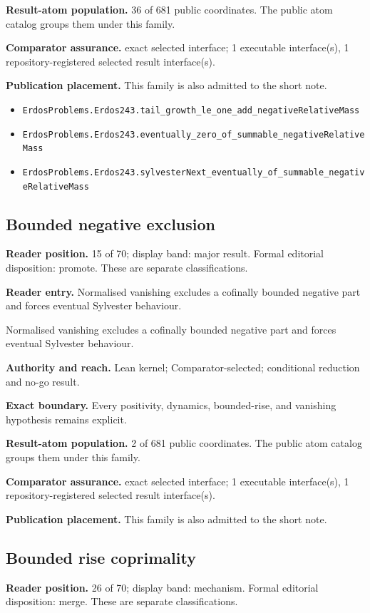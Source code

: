 \documentclass[11pt]{article}
\begin{document}
\textbf{Result-atom population.} 36 of 681 public coordinates. The public atom catalog groups them under this family.

\textbf{Comparator assurance.} exact selected interface; 1 executable interface(s), 1 repository-registered selected result interface(s).

\textbf{Publication placement.} This family is also admitted to the short note.

\begin{itemize}
  \item \nolinkurl{ErdosProblems.Erdos243.tail_growth_le_one_add_negativeRelativeMass}
  \item \nolinkurl{ErdosProblems.Erdos243.eventually_zero_of_summable_negativeRelativeMass}
  \item \nolinkurl{ErdosProblems.Erdos243.sylvesterNext_eventually_of_summable_negativeRelativeMass}
\end{itemize}

\subsection{Bounded negative exclusion}
\textbf{Reader position.} 15 of 70; display band: major result.  Formal editorial disposition: promote.  These are separate classifications.

\textbf{Reader entry.} Normalised vanishing excludes a cofinally bounded negative part and forces eventual Sylvester behaviour.

Normalised vanishing excludes a cofinally bounded negative part and forces eventual Sylvester behaviour.

\textbf{Authority and reach.} Lean kernel; Comparator-selected; conditional reduction and no-go result.

\textbf{Exact boundary.} Every positivity, dynamics, bounded-rise, and vanishing hypothesis remains explicit.

\textbf{Result-atom population.} 2 of 681 public coordinates. The public atom catalog groups them under this family.

\textbf{Comparator assurance.} exact selected interface; 1 executable interface(s), 1 repository-registered selected result interface(s).

\textbf{Publication placement.} This family is also admitted to the short note.

\subsection{Bounded rise coprimality}
\textbf{Reader position.} 26 of 70; display band: mechanism.  Formal editorial disposition: merge.  These are separate classifications.
\end{document}
